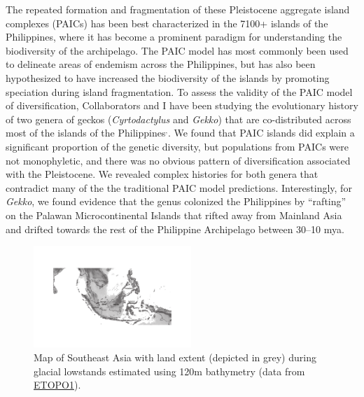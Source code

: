 \documentclass[10pt]{article}
\newcommand{\super}[1]{\ensuremath{^{\textrm{#1}}}}
\begin{document}
The repeated formation and fragmentation of these Pleistocene aggregate island complexes (PAICs) has been best characterized in the 7100+ islands of the Philippines, where it has become a prominent paradigm for understanding the biodiversity of the archipelago.
The PAIC model has most commonly been used to delineate areas of endemism across the Philippines, but has also been hypothesized to have increased the biodiversity of the islands by promoting speciation during island fragmentation.
To assess the validity of the PAIC model of diversification, Collaborators and I have been studying the evolutionary history of two genera of geckos (\emph{Cyrtodactylus} and \emph{Gekko}) that are co-distributed across most of the islands of the Philippines\super{,}.
We found that PAIC islands did explain a significant proportion of the genetic diversity, but populations from PAICs were not monophyletic, and there was no obvious pattern of diversification associated with the Pleistocene.
We revealed complex histories for both genera that contradict many of the the traditional PAIC model predictions.
Interestingly, for \emph{Gekko}, we found evidence that the genus colonized the Philippines by ``rafting'' on the Palawan Microcontinental Islands that rifted away from Mainland Asia and drifted towards the rest of the Philippine Archipelago between 30--10 mya.

\begin{figure}
  \vspace{-1.5em}
  \begin{center}
    \includegraphics[width=0.53\textwidth]{sunda_shelf_small.pdf}
  \end{center}
  \vspace{-0.2em}
  \caption{Map of Southeast Asia with land extent (depicted in grey) during glacial lowstands estimated using 120m bathymetry (data from \href{http://ngdc.noaa.gov/mgg/global/global.html}{ETOPO1}).}
  \label{map}
  \vspace{-1.1em}
\end{figure}
\end{document}

